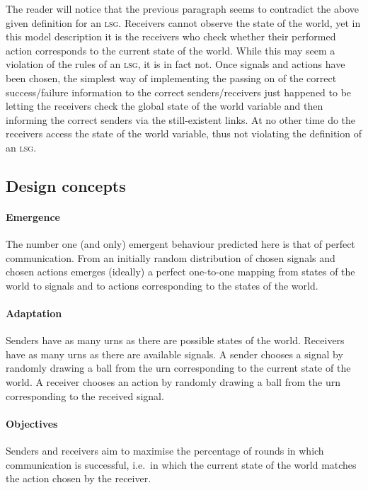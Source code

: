 \documentclass[
	DIV=calc,
	BCOR=0mm,
	pagesize,
]{scrartcl}
\newcommand{\lsg}{\textsc{lsg}}
\begin{document}
The reader will notice that the previous paragraph seems to contradict the above given definition for an \lsg.
Receivers cannot observe the state of the world, yet in this model description it is the receivers who check whether their performed action corresponds to the current state of the world.
While this may seem a violation of the rules of an \lsg, it is in fact not.
Once signals and actions have been chosen, the simplest way of implementing the passing on of the correct success/failure information to the correct senders/receivers just happened to be letting the receivers check the global state of the world variable and then informing the correct senders via the still-existent links.
At no other time do the receivers access the state of the world variable, thus not violating the definition of an \lsg.
 

\subsection{Design concepts}
\label{ssec:moddes}
\paragraph{Emergence}
The number one (and only) emergent behaviour predicted here is that of perfect communication.
From an initially random distribution of chosen signals and chosen actions emerges (ideally) a perfect one-to-one mapping from states of the world to signals and to actions corresponding to the states of the world.
\paragraph{Adaptation}
Senders have as many urns as there are possible states of the world.
Receivers have as many urns as there are available signals.
A sender chooses a signal by randomly drawing a ball from the urn corresponding to the current state of the world.
A receiver chooses an action by randomly drawing a ball from the urn corresponding to the received signal.

\paragraph{Objectives}
Senders and receivers aim to maximise the percentage of rounds in which communication is successful, i.e.~in which the current state of the world matches the action chosen by the receiver.
\end{document}
